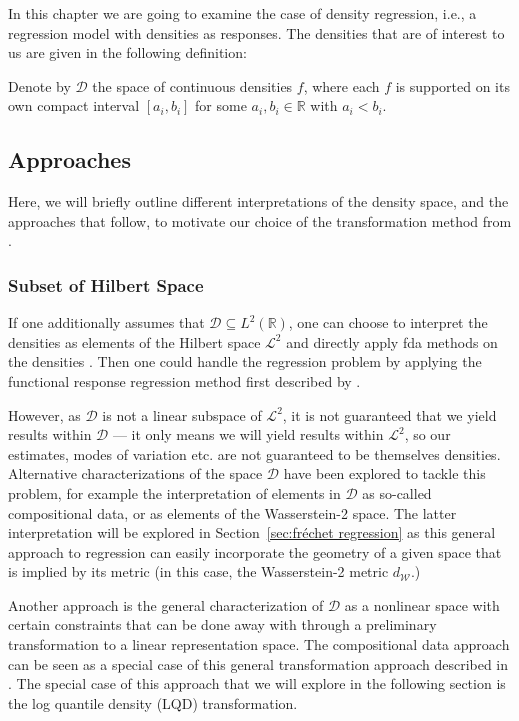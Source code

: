 In this chapter we are going to examine the case of density regression, i.e., a
regression model with densities as responses. The densities that are of interest to
us are given in the following definition:

\begin{definition}
    Denote by $\mathcal{D}$ the space of continuous densities $f$, where each
    $f$ is supported on its own compact interval $[a_i, b_i]$ for some $a_i, b_i \in
    \mathbb{R}$ with $a_i < b_i$.
\end{definition}

\subsection{Approaches}
\label{sec:approaches}
Here, we will briefly outline different interpretations of the density space, and the
approaches that follow, to motivate our choice of the transformation method from
\textcites{PetersenMüller2016}{KokoszkaEtAl2019}.

\subsubsection{Subset of Hilbert Space}
\label{sec:l2_interpretation}
If one additionally assumes that $\mathcal{D} \subseteq L^2(\mathbb{R})$, one can choose
to interpret the densities as elements of the Hilbert space $\mathcal{L}^2$ and directly
apply fda methods on the densities \parencite[see e.g.][]{KneipUtikal2001}. Then one
could handle the regression problem by applying the functional response regression method
first described by \textcite{Faraway1997}.

However, as $\mathcal{D}$ is not a linear subspace of $\mathcal{L}^2$, it is not guaranteed that
we yield results within $\mathcal{D}$ --- it only means we will yield results within $\mathcal{L}^2$,
so our estimates, modes of variation etc. are not guaranteed to be themselves densities.
Alternative characterizations of the space $\mathcal{D}$ have been explored to tackle
this problem, for example the interpretation of elements in $\mathcal{D}$ as so-called
compositional data, or as elements of the Wasserstein-2 space. The latter
interpretation will be explored in Section~\ref{sec:fréchet regression} as this general
approach to regression can easily incorporate the geometry of a given space that is
implied by its metric (in this case, the Wasserstein-2 metric $d_\mathcal{W}$.)

Another approach is the general characterization of $\mathcal{D}$ as a nonlinear space
with certain constraints that can be done away with through a preliminary transformation
to a linear representation space. The compositional data approach can be seen as a
special case of this general transformation approach described in \textcite{PetersenMüller2016}.
The special case of this approach that we will explore in the following section is the
log quantile density (LQD) transformation.

